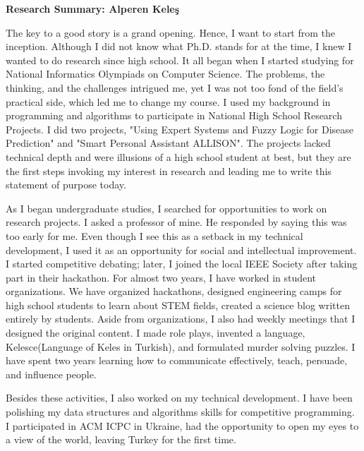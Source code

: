 \documentclass{letter}
\begin{document}
\begin{letter}{}
\opening{\textbf{Research Summary: Alperen Keleş}}


The key to a good story is a grand opening. Hence, I want to start from the inception. Although I did not know what Ph.D. stands for at the time, I knew I wanted to do research since high school.  It all began when I started studying for National Informatics Olympiads on Computer Science. The problems, the thinking, and the challenges intrigued me, yet I was not too fond of the field's practical side, which led me to change my course. I used my background in programming and algorithms to participate in National High School Research Projects. I did two projects, "Using Expert Systems and Fuzzy Logic for Disease Prediction" and "Smart Personal Assistant ALLISON". The projects lacked technical depth and were illusions of a high school student at best, but they are the first steps invoking my interest in research and leading me to write this statement of purpose today. 

As I began undergraduate studies, I searched for opportunities to work on research projects. I asked a professor of mine. He responded by saying this was too early for me. Even though I see this as a setback in my technical development, I used it as an opportunity for social and intellectual improvement. I started competitive debating; later, I joined the local IEEE Society after taking part in their hackathon. For almost two years, I have worked in student organizations. We have organized hackathons, designed engineering camps for high school students to learn about STEM fields, created a science blog written entirely by students. Aside from organizations, I also had weekly meetings that I designed the original content. I made role plays, invented a language, Kelesce(Language of Keles in Turkish), and formulated murder solving puzzles. I have spent two years learning how to communicate effectively, teach, persuade, and influence people.  

Besides these activities, I also worked on my technical development. I have been polishing my data structures and algorithms skills for competitive programming. I participated in ACM ICPC in Ukraine, had the opportunity to open my eyes to a view of the world, leaving Turkey for the first time. 


\end{letter}
\end{document}
